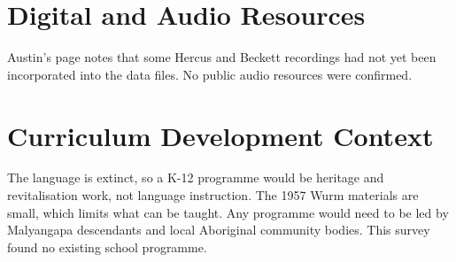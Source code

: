 \documentclass[12pt]{article}
\begin{document}
\section{Digital and Audio Resources}
Austin's page notes that some Hercus and Beckett recordings had not yet been incorporated into the data files. No public audio resources were confirmed.

\section{Curriculum Development Context}
The language is extinct, so a K-12 programme would be heritage and revitalisation work, not language instruction. The 1957 Wurm materials are small, which limits what can be taught. Any programme would need to be led by Malyangapa descendants and local Aboriginal community bodies. This survey found no existing school programme.
\end{document}
